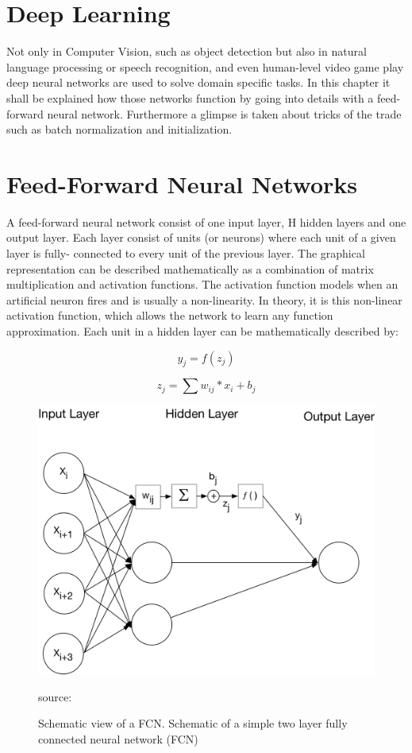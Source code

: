 \section{Deep Learning}

Not only in Computer Vision, such as object detection but also in natural language processing or speech recognition, and even human-level video game play deep neural networks are used to solve domain specific tasks. In this chapter it shall be explained how those networks function by going into details with a feed-forward neural network. Furthermore a glimpse is taken about tricks of the trade such as batch normalization and initialization.


\section{Feed-Forward Neural Networks}
A feed-forward neural network consist of one input layer, H hidden layers and one output layer. Each layer consist of units (or neurons) where each unit of a given layer is fully- connected to every unit of the previous layer. The graphical representation can be described mathematically as a combination of matrix multiplication and activation functions. The activation function models when an artificial neuron fires and is usually a non-linearity. In theory, it is this non-linear activation function, which allows the network to learn any function approximation. Each unit in a hidden layer can be mathematically described by:

\begin{equation}
	y_{j} = f(z_{j})
\end{equation}

\begin{equation}
z_{j} = \sum w_{ij}*x_{i} + b_{j}
\end{equation}

\begin{figure}[H]
	\centering
	\includegraphics[width=0.8\linewidth]{bilder/grundlagen/fast-forward.png}
	\caption{Schematic view of a FCN. Schematic of a simple two layer fully connected neural network (FCN)} source:\cite{Component}
	\label{fig:COMPONENT}
\end{figure}



